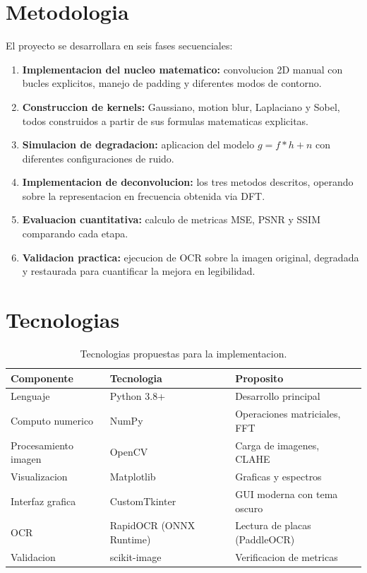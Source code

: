 \documentclass[11pt,a4paper]{article}
\begin{document}
\section{Metodologia}

El proyecto se desarrollara en seis fases secuenciales:

\begin{enumerate}[leftmargin=*]
    \item \textbf{Implementacion del nucleo matematico:} convolucion 2D manual con bucles explicitos, manejo de padding y diferentes modos de contorno.
    \item \textbf{Construccion de kernels:} Gaussiano, motion blur, Laplaciano y Sobel, todos construidos a partir de sus formulas matematicas explicitas.
    \item \textbf{Simulacion de degradacion:} aplicacion del modelo $g = f * h + n$ con diferentes configuraciones de ruido.
    \item \textbf{Implementacion de deconvolucion:} los tres metodos descritos, operando sobre la representacion en frecuencia obtenida via DFT.
    \item \textbf{Evaluacion cuantitativa:} calculo de metricas MSE, PSNR y SSIM comparando cada etapa.
    \item \textbf{Validacion practica:} ejecucion de OCR sobre la imagen original, degradada y restaurada para cuantificar la mejora en legibilidad.
\end{enumerate}

\section{Tecnologias}

\begin{table}[h]
\centering
\begin{tabular}{@{}lll@{}}
\toprule
\textbf{Componente} & \textbf{Tecnologia} & \textbf{Proposito} \\
\midrule
Lenguaje & Python 3.8+ & Desarrollo principal \\
Computo numerico & NumPy & Operaciones matriciales, FFT \\
Procesamiento imagen & OpenCV & Carga de imagenes, CLAHE \\
Visualizacion & Matplotlib & Graficas y espectros \\
Interfaz grafica & CustomTkinter & GUI moderna con tema oscuro \\
OCR & RapidOCR (ONNX Runtime) & Lectura de placas (PaddleOCR) \\
Validacion & scikit-image & Verificacion de metricas \\
\bottomrule
\end{tabular}
\caption{Tecnologias propuestas para la implementacion.}
\end{table}
\end{document}

